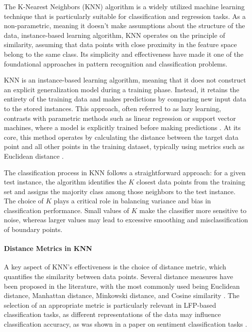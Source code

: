\documentclass{article}
\begin{document}
The K-Nearest Neighbors (KNN) algorithm is a widely utilized machine learning technique that is particularly suitable for classification and regression tasks. As a non-parametric, meaning it doesn't make assumptions about the structure of the data, instance-based learning algorithm, KNN operates on the principle of similarity, assuming that data points with close proximity in the feature space belong to the same class. Its simplicity and effectiveness have made it one of the foundational approaches in pattern recognition and classification problems.

KNN is an instance-based learning algorithm, meaning that it does not construct an explicit generalization model during a training phase. Instead, it retains the entirety of the training data and makes predictions by comparing new input data to the stored instances. This approach, often referred to as lazy learning, contrasts with parametric methods such as linear regression or support vector machines, where a model is explicitly trained before making predictions \cite{gavagsaz2022}. At its core, this method operates by calculating the distance between the target data point and all other points in the training dataset, typically using metrics such as Euclidean distance \cite{sinulingga2023}.

The classification process in KNN follows a straightforward approach: for a given test instance, the algorithm identifies the \( K \) closest data points from the training set and assigns the majority class among those neighbors to the test instance. The choice of \( K \) plays a critical role in balancing variance and bias in classification performance. Small values of \( K \) make the classifier more sensitive to noise, whereas larger values may lead to excessive smoothing and misclassification of boundary points.

\paragraph{Distance Metrics in KNN} A key aspect of KNN's effectiveness is the choice of distance metric, which quantifies the similarity between data points. Several distance measures have been proposed in the literature, with the most commonly used being Euclidean distance, Manhattan distance, Minkowski distance, and Cosine similarity \cite{leskovec2020}. The selection of an appropriate metric is particularly relevant in LFP-based classification tasks, as different representations of the data may influence classification accuracy, as was shown in a paper on sentiment classification tasks \cite{romli2021}.
\end{document}
